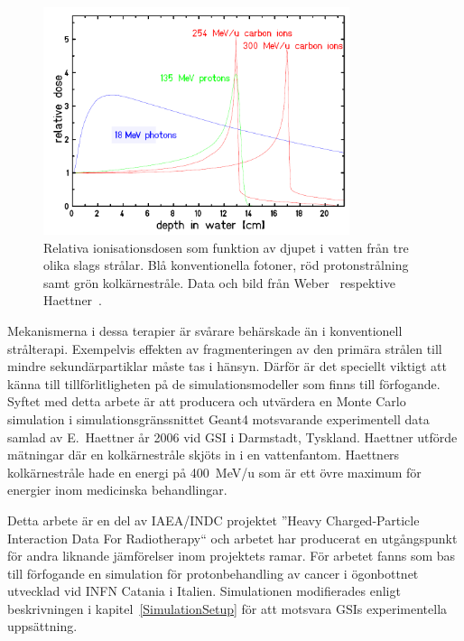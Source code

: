 \begin{figure}[!h]
\begin{center}
\includegraphics[width=0.8\textwidth]{images/DosesFromHaettner.png}  
\caption{\label{fig:DosesFromHaettnerSvenska}Relativa ionisationsdosen som funktion av djupet i vatten från tre olika slags strålar. Blå konventionella fotoner, röd protonstrålning samt grön kolkärnestråle. Data och bild från Weber~\cite{weber} respektive Haettner~\cite{ehaettner}.} 
\end{center}
\end{figure} 

Mekanismerna i dessa terapier är svårare behärskade än i konventionell strålterapi. Exempelvis effekten av fragmenteringen av den primära strålen till mindre sekundärpartiklar måste tas i hänsyn. Därför är det speciellt viktigt att känna till tillförlitligheten på de simulationsmodeller som finns till förfogande. Syftet med detta arbete är att producera och utvärdera en Monte Carlo simulation i simulationsgränssnittet Geant4 motsvarande experimentell data samlad av E.~Haettner år 2006 vid GSI i Darmstadt, Tyskland. Haettner utförde mätningar där en kolkärnestråle skjöts in i en vattenfantom. Haettners kolkärnestråle hade en energi på 400~MeV/u som är ett övre maximum för energier inom medicinska behandlingar.

Detta arbete är en del av IAEA/INDC projektet ''Heavy Charged-Particle Interaction Data For Radiotherapy`` och arbetet har producerat en utgångspunkt för andra liknande jämförelser inom projektets ramar. För arbetet fanns som bas till förfogande en simulation för protonbehandling av cancer i ögonbottnet utvecklad vid INFN Catania i Italien. Simulationen modifierades enligt beskrivningen i kapitel~\ref{SimulationSetup} för att motsvara GSIs experimentella uppsättning.

